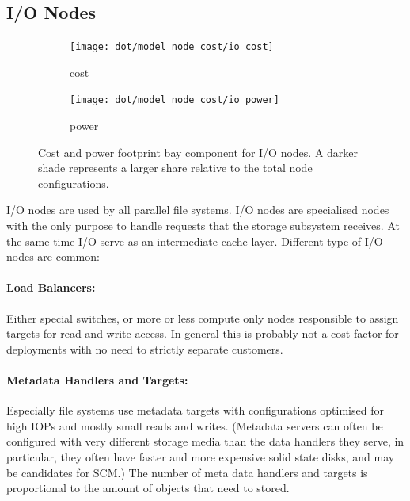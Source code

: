 \documentclass{../../template/esiwace-report}
\begin{document}

\subsection{I/O Nodes}
\label{sec:modeling/components/ionodes}




\begin{figure} [htb]
	\centering
	\begin{subfigure}[t]{0.49\textwidth}
		\centering
		\texttt{[image: dot/model\_node\_cost/io\_cost]}
		\caption{cost}
	\end{subfigure}
	\begin{subfigure}[t]{0.49\textwidth}
		\centering
		\texttt{[image: dot/model\_node\_cost/io\_power]}
		\caption{power}
	\end{subfigure}


	\caption{Cost and power footprint bay component for I/O nodes. A darker shade represents a larger share relative to the total node configurations.}
\label{fig:components-compute-ionode}
\end{figure}


I/O nodes are used by all parallel file systems. I/O nodes are specialised nodes with the only purpose to handle requests that the storage subsystem receives. At the same time I/O serve as an intermediate cache layer. Different type of I/O nodes are common:

\paragraph{Load Balancers:}
Either special switches, or more or less compute only nodes responsible to assign targets for read and write access.
In general this is probably not a cost factor for deployments with no need to strictly separate customers.

\paragraph{Metadata Handlers and Targets:}
Especially file systems use metadata targets with configurations optimised for high IOPs and mostly small reads and writes. (Metadata servers can
often be configured with very different storage media than the data handlers they serve, in particular, they often have faster and more expensive
solid state disks, and may be candidates for SCM.) The number of meta data handlers and targets is proportional to the amount of objects that need to stored.
\end{document}

